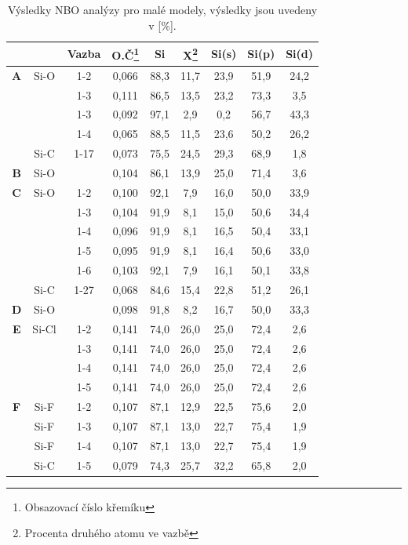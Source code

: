\documentclass[
  digital, %
  table,   %
  lof,     %
  lot,     %
  oneside,
]{fithesis3}
\begin{document}
\begin{table}[htbp]
  \begin{minipage}{\textwidth}
\caption{Výsledky NBO analýzy pro malé modely, výsledky jsou uvedeny v [\%].}
\begin{center}
  \begin{tabular}{|c|c|c|c|c|c|c|c|c|}
  \hline
  \label{nbo_small} &  & Vazba & O.Č\footnote{Obsazovací číslo křemíku} & Si & X\footnote{Procenta druhého atomu ve  vazbě} & Si(s) & Si(p) &Si(d) \\ \hline
\textbf{A} & Si-O & 1-2  & 0,066 & 88,3  & 11,7  & 23,9  & 51,9  & 24,2  \\ \hline
   &  & 1-3 & 0,111 & 86,5  & 13,5  & 23,2  & 73,3  & 3,5  \\ \hline
   &  & 1-3 & 0,092 & 97,1  & 2,9  & 0,2  & 56,7  & 43,3  \\ \hline
   &  & 1-4 & 0,065 & 88,5  & 11,5  & 23,6  & 50,2  & 26,2  \\ \hline
   & Si-C & 1-17 & 0,073 & 75,5  & 24,5  & 29,3  & 68,9  & 1,8  \\ \hline
  \textbf{B} & Si-O &  & 0,104 & 86,1  & 13,9  & 25,0  & 71,4  & 3,6  \\ \hline
 \textbf{C} & Si-O & 1-2  & 0,100 & 92,1  & 7,9  & 16,0  & 50,0  & 33,9  \\ \hline
   &  & 1-3 & 0,104 & 91,9  & 8,1  & 15,0  & 50,6  & 34,4  \\ \hline
   &  & 1-4 & 0,096 & 91,9  & 8,1  & 16,5  & 50,4  & 33,1  \\ \hline
   &  & 1-5 & 0,095 & 91,9  & 8,1  & 16,4  & 50,6  & 33,0  \\ \hline
   &  & 1-6 & 0,103 & 92,1  & 7,9  & 16,1  & 50,1  & 33,8  \\ \hline
   & Si-C & 1-27 & 0,068 & 84,6  & 15,4  & 22,8  & 51,2  & 26,1  \\ \hline
  \textbf{D} & Si-O &  & 0,098 & 91,8  & 8,2  & 16,7  & 50,0  & 33,3  \\ \hline
  \textbf{E} & Si-Cl & 1-2  & 0,141 & 74,0  & 26,0  & 25,0  & 72,4  & 2,6  \\ \hline
   &  & 1-3 & 0,141 & 74,0  & 26,0  & 25,0  & 72,4  & 2,6  \\ \hline
   &  & 1-4 & 0,141 & 74,0  & 26,0  & 25,0  & 72,4  & 2,6  \\ \hline
   &  & 1-5 & 0,141 & 74,0  & 26,0  & 25,0  & 72,4  & 2,6  \\ \hline
  \textbf{F}  & Si-F &1-2 &0,107 & 87,1  & 12,9  & 22,5  & 75,6  & 2,0  \\ \hline
 & Si-F &1-3 & 0,107 & 87,1  & 13,0  & 22,7  & 75,4  & 1,9  \\ \hline
 & Si-F &1-4 &0,107 & 87,1  & 13,0  & 22,7  & 75,4  & 1,9  \\ \hline
 & Si-C &1-5 &0,079 & 74,3  & 25,7  & 32,2  & 65,8  & 2,0  \\ \hline
  \end{tabular}
\end{center}
\end{minipage}
\end{table}
\end{document}

